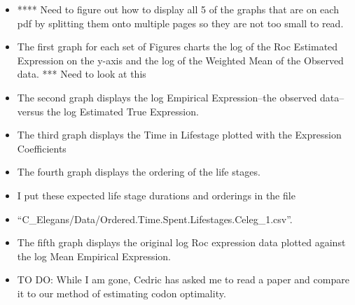 \documentclass[letterpaper,index=totoc,hyperref,openany]{labbook} %
\begin{document}
\begin{itemize}
\item **** Need to figure out how to display all 5 of the graphs that are on each pdf by splitting them onto multiple pages so they are not too small to read.
\item The first graph for each set of Figures charts the log of the Roc Estimated Expression on the y-axis and the log of the Weighted Mean of the Observed data. *** Need to look at this
\item The second graph displays the log Empirical Expression--the observed data-- versus the log Estimated True Expression.
\item The third graph displays the Time in Lifestage plotted with the Expression Coefficients
\item The fourth graph displays the ordering of the life stages.
\item I put these expected life stage durations and orderings in the file
\item  \enquote{C\_Elegans/Data/Ordered.Time.Spent.Lifestages.Celeg\_1.csv}.
\item The fifth graph displays the original log Roc expression data plotted against the log Mean Empirical Expression.
\item TO DO: While I am gone, Cedric has asked me to read a paper and compare it to our method of estimating codon optimality.
\end{itemize}
\end{document}
